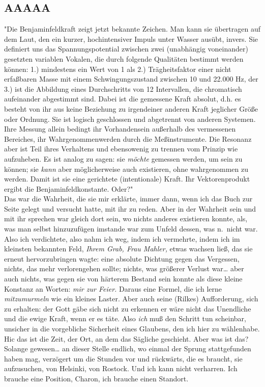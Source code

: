 \documentclass[
]{article}
\author{}
\date{\vspace{-2.5em}}
\begin{document}
\subsection{AAAAA}\label{aaaaa}

"Die Benjaminfeldkraft zeigt jetzt bekannte Zeichen. Man kann sie
übertragen auf dem Laut, den ein kurzer, hochintensiver Impuls unter
Wasser ausübt, invers. Sie definiert uns das Spannungspotential zwischen
zwei (unabhängig voneinander) gesetzten variablen Vokalen, die durch
folgende Qualitäten bestimmt werden können: 1.) mindestens ein Wert von
1 als 2.) Trägheitsfaktor einer nicht erfaßbaren Masse mit einem
Schwingungszustand zwischen 10 und 22.000 Hz, der 3.) ist die Abbildung
eines Durchschritts von 12 Intervallen, die chromatisch aufeinander
abgestimmt sind. Dabei ist die gemessene Kraft absolut, d.h. es besteht
von ihr aus keine Beziehung zu irgendeiner anderen Kraft jeglicher Größe
oder Ordnung. Sie ist logisch geschlossen und abgetrennt von anderen
Systemen. Ihre Messung allein bedingt ihr Vorhandensein außerhalb des
vermessenen Bereiches, ihr Wahrgenommenwerden durch die Meßinstrumente.
Die Resonanz aber ist Teil ihres Verhaltens und ebensowenig zu trennen
vom Prinzip wie aufzuheben. Es ist analog zu sagen: sie \emph{möchte}
gemessen werden, um sein zu können; sie \emph{kann} aber möglicherweise
auch existieren, ohne wahrgenommen zu werden. Damit ist sie eine
gerichtete (intentionale) Kraft. Ihr Vektorenprodukt ergibt die
Benjaminfeldkonstante. Oder?"\\
Das war die Wahrheit, die sie mir erklärte, immer dann, wenn ich das
Buch zur Seite gelegt und versucht hatte, mit ihr zu reden. Aber in der
Wahrheit sein und mit ihr sprechen war gleich dort sein, wo nichts
anderes existieren konnte, als, was man selbst hinzuzufügen imstande war
zum Unfeld dessen, was n.~nicht war. Also ich verdichtete, also nahm ich
weg, indem ich vermehrte, indem ich im kleinsten bekannten Feld,
\emph{Ihrem Grab, Frau Mahler,} etwas wachsen ließ, das sie erneut
hervorzubringen wagte: eine absolute Dichtung gegen das Vergessen,
nichts, das mehr verlorengehen sollte; nichts, was größerer Verlust
war\ldots{} aber auch nichts, was gegen sie von härterem Bestand sein
konnte als diese kleine Konstanz an Worten: \emph{mir zur Feier.} Daraus
eine Formel, die ich lerne \emph{mitzumurmeln} wie ein kleines Laster.
Aber auch seine (Rilkes) Aufforderung, sich zu erhalten: der Gott gäbe
sich nicht zu erkennen er wäre nicht das Unendliche und die ewige Kraft,
wenn er es täte. Also \emph{ich} muß den Schritt tun scheinbar, unsicher
in die vorgebliche Sicherheit eines Glaubens, den ich hier zu
wählenhabe. Hic das ist die Zeit, der Ort, an dem das Sägliche
geschieht. Aber was ist das? Solange gewesen\ldots{} an dieser Stelle
endlich, wo einmal der Sprung stattgefunden haben mag, verzögert um die
Stunden vor und rückwärts, die es braucht, sie aufzusuchen, von
Helsinki, von Rostock. Und ich kann nicht verharren. Ich brauche eine
Position, Charon, ich brauche einen Standort.
\end{document}
